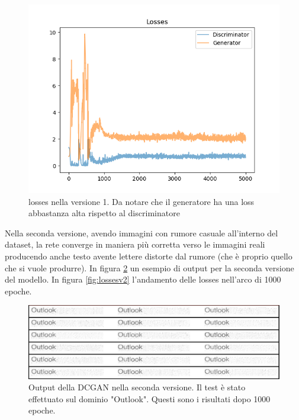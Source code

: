 \begin{figure}[!h]
  \centering
  \begin{minipage}[b]{0.9\textwidth}
    \includegraphics[width=\textwidth]{pictures/lossesV1.png}
    \caption{losses nella versione 1. Da notare che il generatore ha una loss abbastanza alta rispetto al discriminatore}
    \label{fig:lossesv1}
  \end{minipage}
  \hfill
\end{figure}
Nella seconda versione, avendo immagini con rumore casuale all'interno del dataset, la rete converge in maniera più corretta verso le immagini reali producendo anche testo avente lettere distorte dal rumore (che è proprio quello che si vuole produrre). In figura \ref{fig:dcganv2} un esempio di output per la seconda versione del modello. In figura \ref{fig:lossesv2} l'andamento delle losses nell'arco di 1000 epoche.
\begin{figure}[!h]
  \centering
  \begin{minipage}[b]{\textwidth}
    \includegraphics[width=\textwidth]{pictures/maxpool.png}
    \caption{Output della DCGAN nella seconda versione. Il test è stato effettuato sul dominio "Outlook". Questi sono i risultati dopo 1000 epoche.}
    \label{fig:dcganv2}
  \end{minipage}
  \hfill
\end{figure}

